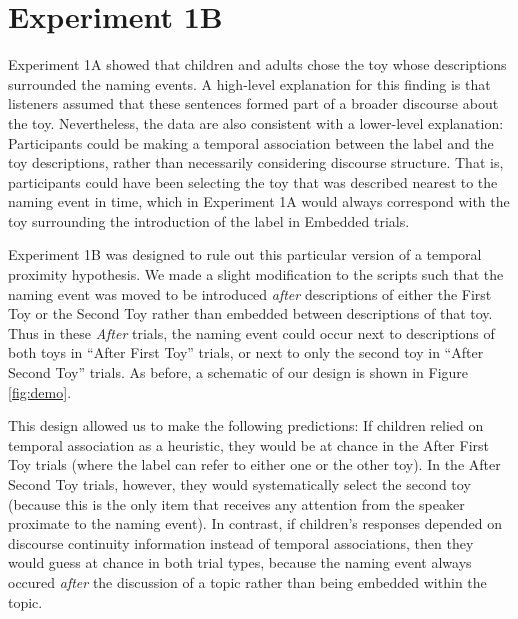 \documentclass[man]{apa2}
\begin{document}


 
 
\section{Experiment 1B}

Experiment 1A showed that children and adults chose the toy whose descriptions surrounded the naming events. A high-level explanation for this finding is that listeners assumed that these sentences formed part of a broader discourse about the toy. Nevertheless, the data are also consistent with a lower-level explanation: Participants could be making a temporal association between the label and the toy descriptions, rather than necessarily considering discourse structure. That is, participants could have been selecting the toy that was described nearest to the naming event in time, which in Experiment 1A would always correspond with the toy surrounding the introduction of the label in Embedded trials. 

Experiment 1B was designed to rule out this particular version of a temporal proximity hypothesis.  We made a slight modification to the scripts such that the naming event was moved to be introduced \emph{after} descriptions of either the First Toy or the Second Toy rather than embedded between descriptions of that toy.  
Thus in these \emph{After} trials, the naming event could occur next to descriptions of both toys in ``After First Toy'' trials, or next to only the second toy in ``After Second Toy'' trials. As before, a schematic of our design is shown in Figure \ref{fig:demo}.

This design allowed us to make the following predictions:  If children relied on temporal association as a heuristic, they would be at chance in the After First Toy trials (where the label can refer to either one or the other toy).  In the After Second Toy trials, however, they would systematically select the second toy (because this is the only item that receives any attention from the speaker proximate to the naming event). In contrast, if children's responses depended on discourse continuity information instead of temporal associations, then they would guess at chance in both trial types, because the naming event always occured \emph{after} the discussion of a topic rather than being embedded within the topic. 
\end{document}
